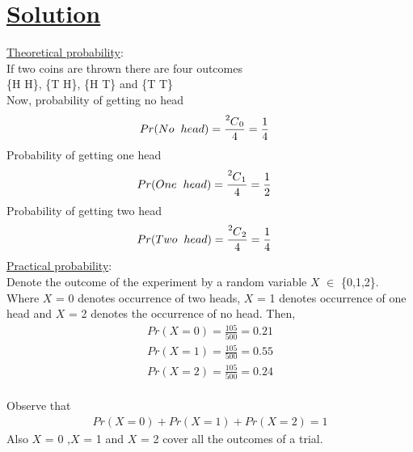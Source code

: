\documentclass[journal,12pt,twocolumn]{IEEEtran}
\newcommand\Mycomb[2][^n]{\prescript{#1\mkern-0.5mu}{}C_{#2}}
\begin{document}
\section{\large\underline{Solution}}
\noindent \underline{Theoretical probability}:\\
\noindent If two coins are thrown there are four outcomes \\
\{H H\}, \{T H\}, \{H T\} and \{T T\} \\
Now, probability of getting no head 
\begin{align}
&Pr(No \hspace{2mm} head) = \frac{\Mycomb[2]{0}}{4} = \frac{1}{4}
\end{align}
Probability of getting one head 
\begin{align}
&Pr(One \hspace{2mm} head) = \frac{\Mycomb[2]{1}}{4} = \frac{1}{2}
\end{align}
Probability of getting two head 
\begin{align}
&Pr(Two \hspace{2mm} head) = \frac{\Mycomb[2]{2}}{4} = \frac{1}{4}
\end{align}
\noindent \underline{Practical probability}:\\
\noindent Denote the outcome of the experiment by a random variable $X$ $\in$ \{0,1,2\}.\\ Where $X$ = 0 denotes occurrence of two heads, $X$ = 1 denotes occurrence of one head and $X$ = 2 denotes the occurrence of no head. Then,
\begin{align}
Pr(X = 0) = \frac{105}{500} = 0.21 \\
Pr(X = 1) = \frac{105}{500} = 0.55 \\
Pr(X = 2) = \frac{105}{500} = 0.24 
\end{align}\\
Observe that 
\begin{align*}
Pr(X = 0) + Pr(X = 1) + Pr(X = 2) = 1
\end{align*}
 Also $X$ = 0 ,$X$ = 1 and $X$ = 2 cover all the outcomes of a trial.
\end{document}
